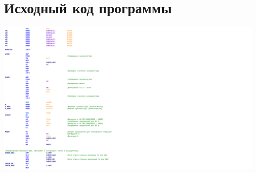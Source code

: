 \documentclass[12pt]{article}
\begin{document}
	\section{Исходный код программы}
	\includegraphics[width=2\linewidth]{colored_code.pdf}
	\newpage
	
\end{document}
